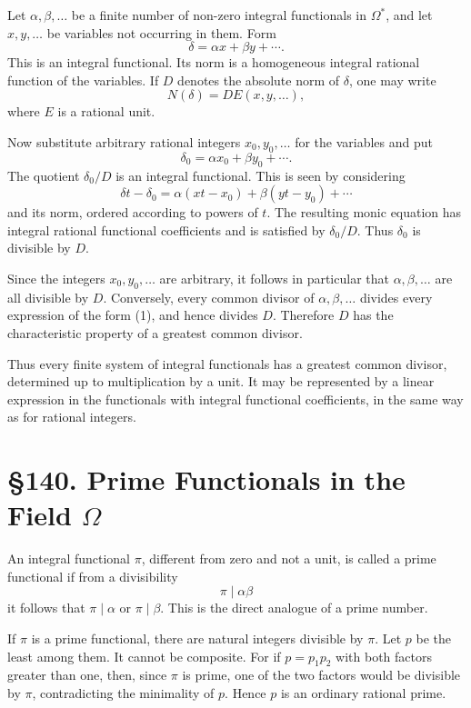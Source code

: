 \documentclass[11pt,a4paper]{book}
\newcommand{\webersection}[2]{\clearpage\section*{\S #1. #2}}
\begin{document}
Let \(\alpha,\beta,\ldots\) be a finite number of non-zero integral functionals in \(\Omega^*\), and let \(x,y,\ldots\) be variables not occurring in them.  Form
\begin{equation}
 \delta=\alpha x+
\beta y+
\cdots . \tag{1}
\end{equation}
This is an integral functional.  Its norm is a homogeneous integral rational function of the variables.  If \(D\) denotes the absolute norm of \(\delta\), one may write
\begin{equation}
 N(\delta)=D E(x,y,\ldots), \tag{2}
\end{equation}
where \(E\) is a rational unit.

Now substitute arbitrary rational integers \(x_0,y_0,
\ldots\) for the variables and put
\[
 \delta_0=\alpha x_0+
\beta y_0+
\cdots .
\]
The quotient \(\delta_0/D\) is an integral functional.  This is seen by considering
\[
 \delta t-
\delta_0=\alpha(xt-x_0)+
\beta(yt-y_0)+
\cdots
\]
and its norm, ordered according to powers of \(t\).  The resulting monic equation has integral rational functional coefficients and is satisfied by \(\delta_0/D\).  Thus \(\delta_0\) is divisible by \(D\).

Since the integers \(x_0,y_0,
\ldots\) are arbitrary, it follows in particular that \(\alpha,
\beta,
\ldots\) are all divisible by \(D\).  Conversely, every common divisor of \(\alpha,
\beta,
\ldots\) divides every expression of the form (1), and hence divides \(D\).  Therefore \(D\) has the characteristic property of a greatest common divisor.

Thus every finite system of integral functionals has a greatest common divisor, determined up to multiplication by a unit.  It may be represented by a linear expression in the functionals with integral functional coefficients, in the same way as for rational integers.

\webersection{140}{Prime Functionals in the Field \(\Omega\)}

An integral functional \(\pi\), different from zero and not a unit, is called a prime functional if from a divisibility
\[
 \pi\mid \alpha\beta
\]
it follows that \(\pi\mid\alpha\) or \(\pi\mid\beta\).  This is the direct analogue of a prime number.

If \(\pi\) is a prime functional, there are natural integers divisible by \(\pi\).  Let \(p\) be the least among them.  It cannot be composite.  For if \(p=p_1p_2\) with both factors greater than one, then, since \(\pi\) is prime, one of the two factors would be divisible by \(\pi\), contradicting the minimality of \(p\).  Hence \(p\) is an ordinary rational prime.
\end{document}
